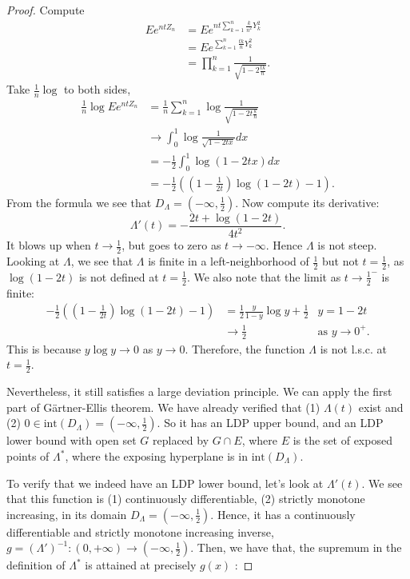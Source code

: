 \begin{proof}
	Compute
	\begin{align*}
		E e^{n t Z_n}
		&= E e^{n t \sum_{k=1}^{n} \frac{k}{n^2}Y_k^2} \\
		&= E e^{\sum_{k=1}^{n} \frac{tk}{n}Y_k^2} \\
		&= \prod_{k=1}^{n} \frac{1}{\sqrt{1 - 2 \frac{t k}{n}} } 
	.\end{align*}
	Take $\frac{1}{n} \log $ to both sides,
	\begin{align*}
		\frac{1}{n} \log E e^{n t Z_n}
		&=\frac{1}{n} \sum_{k=1}^{n} \log \frac{1}{\sqrt{1 - 2 t \frac{k}{n}} }\\
		&\to \int _0^1 \log \frac{1}{\sqrt{1 - 2 t x} } dx\\
		&= -\frac{1}{2} \int _0^1 \log (1 - 2 t x) dx \\
		&= -\frac{1}{2}\left((1 - \frac{1}{2 t}) \log (1 - 2 t) - 1\right)
	.\end{align*}
	From the formula we see that $D_\Lambda = (- \infty , \frac{1}{2})$. Now compute its derivative:
	\[
		\Lambda' (t) = - \frac{2 t + \log (1 - 2 t)}{4 t^2}
	.\] 
	It blows up when $t \to \frac{1}{2}$, but goes to zero as $t \to  - \infty $. Hence $\Lambda$ is not steep. Looking at $\Lambda$, we see that $\Lambda$ is finite in a left-neighborhood of $\frac{1}{2}$ but not $t = \frac{1}{2}$, as $\log (1 - 2 t)$ is not defined at $t = \frac{1}{2}$. We also note that the limit as $t \to \frac{1}{2}^-$ is finite:
	\begin{align*}
		-\frac{1}{2} \left( (1 - \frac{1}{2t}) \log (1 - 2 t) - 1 \right) 
		&= \frac{1}{2}\frac{y}{1 - y} \log  y + \frac{1}{2} & y = 1 - 2 t \\
		&\to \frac{1}{2} & \text{as }y \to 0^+
	.\end{align*}
	This is because $y \log  y \to 0$ as $y \to 0$. Therefore, the function $\Lambda$ is not l.s.c. at $t = \frac{1}{2}$.

	Nevertheless, it still satisfies a large deviation principle. We can apply the first part of Gärtner-Ellis theorem. We have already verified that (1) $\Lambda(t)$ exist and (2) $0 \in \text{int} (D_\Lambda) = (- \infty , \frac{1}{2})$. So it has an LDP upper bound, and an LDP lower bound with open set $G$ replaced by $G \cap E$, where $E$ is the set of exposed points of $\Lambda^*$, where the exposing hyperplane is in $\text{int} (D_\Lambda)$.

	To verify that we indeed have an LDP lower bound, let's look at $\Lambda'(t)$. We see that this function is (1) continuously differentiable, (2) strictly monotone increasing, in its domain $D_\Lambda= (- \infty , \frac{1}{2})$. Hence, it has a continuously differentiable and strictly monotone increasing inverse, $g = (\Lambda')^{-1} : (0, + \infty ) \to (- \infty , \frac{1}{2})$. Then, we have that, the supremum in the definition of $\Lambda^*$ is attained at precisely $g(x)$ :


\end{proof}
